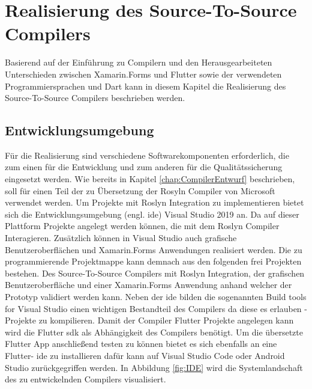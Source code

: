 \chapter{Realisierung des Source-To-Source Compilers}
\label{chap:Realisierung}

Basierend auf der Einführung zu Compilern und den Herausgearbeiteten Unterschieden zwischen Xamarin.Forms und Flutter sowie der verwendeten Programmiersprachen \Csharp und Dart kann in diesem Kapitel die Realisierung des Source-To-Source Compilers beschrieben werden. 

\section{Entwicklungsumgebung}
Für die Realisierung sind verschiedene Softwarekomponenten erforderlich,  die zum einen für die Entwicklung und zum anderen für die Qualitätssicherung eingesetzt werden.  Wie bereits in Kapitel \ref{chap:CompilerEntwurf} beschrieben,  soll für einen Teil der zu Übersetzung der Rosyln Compiler von Microsoft verwendet werden.  Um Projekte mit Roslyn Integration zu implementieren bietet sich die Entwicklungsumgebung (engl.  \ac{ide}) Visual Studio 2019 an.  Da auf dieser  Plattform Projekte angelegt werden können,  die mit dem Roslyn Compiler Interagieren.  Zusätzlich können in Visual Studio auch grafische Benutzeroberflächen und Xamarin.Forms Anwendungen realisiert werden.  Die zu programmierende Projektmappe kann demnach aus den folgenden frei Projekten bestehen.  Des Source-To-Source Compilers mit Roslyn Integration, der grafischen Benutzeroberfläche und einer Xamarin.Forms Anwendung anhand welcher der Prototyp validiert werden kann.  Neben der \ac{ide} bilden die sogenannten Build tools for Visual Studio einen wichtigen Bestandteil des Compilers da diese es erlauben \Csharp -Projekte zu kompilieren.  Damit der Compiler Flutter Projekte angelegen kann wird die Flutter \ac{sdk} als Abhängigkeit des Compilers benötigt.  Um die übersetzte Flutter App anschließend testen zu können bietet es sich ebenfalls an eine Flutter- \ac{ide} zu installieren dafür kann auf Visual Studio Code oder Android Studio zurückgegriffen werden.  In Abbildung \ref{fig:IDE} wird die Systemlandschaft des zu entwickelnden Compilers visualisiert. 



